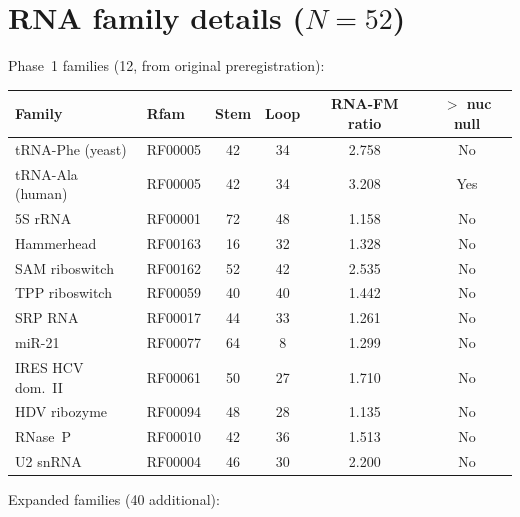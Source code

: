 \documentclass[11pt]{article}
\begin{document}
\appendix
\section{RNA family details ($N = 52$)}
\label{sec:appendix_families}

Phase~1 families (12, from original preregistration):

\begin{table}[h]
\centering
\small
\begin{tabular}{@{}llcccc@{}}
\toprule
\textbf{Family} & \textbf{Rfam} & \textbf{Stem} & \textbf{Loop} &
  \textbf{RNA-FM ratio} & \textbf{$>$ nuc null} \\
\midrule
tRNA-Phe (yeast)    & RF00005 & 42 & 34 & 2.758 & No \\
tRNA-Ala (human)    & RF00005 & 42 & 34 & 3.208 & Yes \\
5S rRNA             & RF00001 & 72 & 48 & 1.158 & No \\
Hammerhead          & RF00163 & 16 & 32 & 1.328 & No \\
SAM riboswitch      & RF00162 & 52 & 42 & 2.535 & No \\
TPP riboswitch      & RF00059 & 40 & 40 & 1.442 & No \\
SRP RNA             & RF00017 & 44 & 33 & 1.261 & No \\
miR-21              & RF00077 & 64 &  8 & 1.299 & No \\
IRES HCV dom.~II    & RF00061 & 50 & 27 & 1.710 & No \\
HDV ribozyme        & RF00094 & 48 & 28 & 1.135 & No \\
RNase~P             & RF00010 & 42 & 36 & 1.513 & No \\
U2 snRNA            & RF00004 & 46 & 30 & 2.200 & No \\
\bottomrule
\end{tabular}
\end{table}

Expanded families (40 additional):
\end{document}
